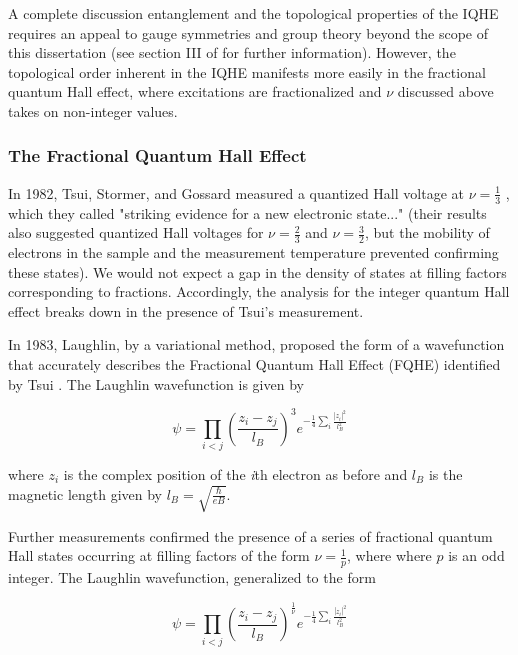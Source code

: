 A complete discussion entanglement and the topological properties of the IQHE requires an appeal to gauge symmetries and group theory beyond the scope of this dissertation (see section III of \cite{Wen2017} for further information). However, the topological order inherent in the IQHE manifests more easily in the fractional quantum Hall effect, where excitations are fractionalized and $\nu$ discussed above takes on non-integer values.

\subsubsection{The Fractional Quantum Hall Effect}

In 1982, Tsui, Stormer, and Gossard measured a quantized Hall voltage at $\nu = \frac{1}{3}$ \cite{Tsui1982}, which they called "striking evidence for a new electronic state..." (their results also suggested quantized Hall voltages for $\nu = \frac{2}{3}$ and $\nu = \frac{3}{2}$, but the mobility of electrons in the sample and the measurement temperature prevented confirming these states). We would not expect a gap in the density of states at filling factors corresponding to fractions. Accordingly, the analysis for the integer quantum Hall effect breaks down in the presence of Tsui's measurement.

In 1983, Laughlin, by a variational method, proposed the form of a wavefunction that accurately describes the Fractional Quantum Hall Effect (FQHE) identified by Tsui \cite{Laughlin1983}. The Laughlin wavefunction is given by

\begin{equation}
\psi = \prod_{i < j} \left( \frac{z_{i} - z_{j}}{l_{B}} \right)^{3} e^{-\frac{1}{4} \sum_{i} \frac{|z_{i}|^{2}}{l_{B}^{2}}}
\end{equation}

where $z_{i}$ is the complex position of the \textit{i}th electron as before and $l_{B}$ is the magnetic length given by $l_{B} = \sqrt{\frac{\hbar}{eB}}$.

Further measurements confirmed the presence of a series of fractional quantum Hall states occurring at filling factors of the form $\nu = \frac{1}{p}$, where where $p$ is an odd integer. The Laughlin wavefunction, generalized to the form

\begin{equation}
\psi = \prod_{i < j} \left( \frac{z_{i} - z_{j}}{l_{B}} \right)^{\frac{1}{\nu}} e^{-\frac{1}{4} \sum_{i} \frac{|z_{i}|^{2}}{l_{B}^{2}}}
\end{equation}


